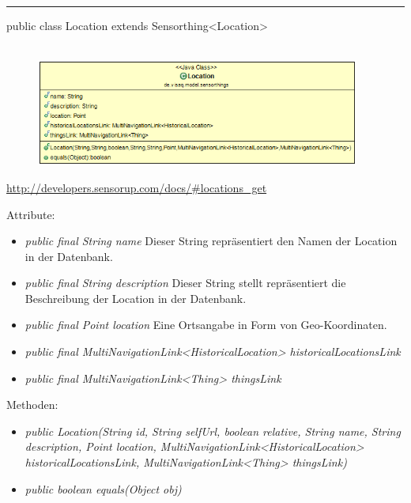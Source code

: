 \rule{\textwidth}{0.4pt}
public class Location extends Sensorthing<Location>
\\\\
\begin{minipage}{0.4\textwidth}
    \begin{figure}[H]
        {\centering\includegraphics[width=0.95\textwidth]{media/backend/modell/classes/Location.png}}
    \end{figure}
    \end{minipage} \hfill
\begin{minipage}{0.6\textwidth}
    \url{http://developers.sensorup.com/docs/#locations_get}
\end{minipage}

Attribute:
\begin{itemize}
    \item \emph{public final String name} Dieser String repräsentiert den Namen der Location in der Datenbank.
    \item \emph{public final String description} Dieser String stellt repräsentiert die Beschreibung der Location in der Datenbank.
    \item \emph{public final Point location} Eine Ortsangabe in Form von Geo-Koordinaten.
    \item \emph{public final MultiNavigationLink<HistoricalLocation> historicalLocationsLink} 
    \item \emph{public final MultiNavigationLink<Thing> thingsLink} 
\end{itemize}
Methoden:
\begin{itemize}
    \item \emph{public Location(String id, String selfUrl, boolean relative, String name, String description, Point location, MultiNavigationLink<HistoricalLocation> historicalLocationsLink, MultiNavigationLink<Thing> thingsLink)}
    \item \emph{public boolean equals(Object obj)} 
\end{itemize}

